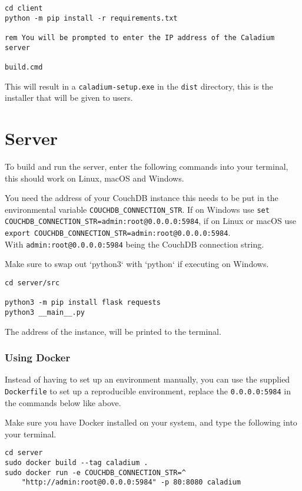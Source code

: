 \begin{appendices}
\begin{lstlisting}
cd client
python -m pip install -r requirements.txt

rem You will be prompted to enter the IP address of the Caladium server

build.cmd
\end{lstlisting}

This will result in a \texttt{caladium-setup.exe} in the \texttt{dist} directory,
this is the installer that will be given to users.
\section{Server}
To build and run the server, enter the following commands into your terminal,
this should work on Linux, macOS and Windows.

You need the address of your CouchDB instance this needs
to be put in the environmental variable \texttt{COUCHDB\_CONNECTION\_STR}.
If on Windows use
\texttt{set COUCHDB\_CONNECTION\_STR=admin:root@0.0.0.0:5984},
if on Linux or macOS use
\texttt{export COUCHDB\_CONNECTION\_STR=admin:root@0.0.0.0:5984}. \\
With \texttt{admin:root@0.0.0.0:5984} being the CouchDB connection string.

Make sure to swap out `python3` with `python` if executing on Windows.
\begin{lstlisting}
cd server/src

python3 -m pip install flask requests
python3 __main__.py
\end{lstlisting}
The address of the instance, will be printed to the terminal.

\subsubsection{Using Docker}
Instead of having to set up an environment manually,
you can use the supplied \texttt{Dockerfile}
to set up a reproducible environment,
replace the \texttt{0.0.0.0:5984} in the commands below like above.

Make sure you have Docker installed on your system,
and type the following into your terminal.

\begin{lstlisting}
cd server
sudo docker build --tag caladium .
sudo docker run -e COUCHDB_CONNECTION_STR=^
    "http://admin:root@0.0.0.0:5984" -p 80:8080 caladium
\end{lstlisting}

\end{appendices}
